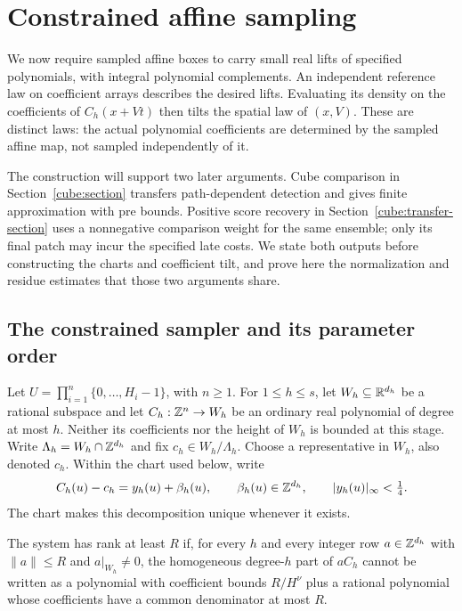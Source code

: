 \section{Constrained affine sampling}
\label{sampling:constrained-section}

We now require sampled affine boxes to carry small real lifts of
specified polynomials, with integral polynomial complements.
An independent reference law on coefficient arrays describes the
desired lifts. Evaluating its density on the coefficients of
$C_h(x+Vt)$ then tilts the spatial law of $(x,V)$. These are distinct
laws: the actual polynomial coefficients are determined by the
sampled affine map, not sampled independently of it.

The construction will support two later arguments. Cube comparison
in Section~\ref{cube:section} transfers path-dependent detection and
gives finite approximation with pre bounds. Positive score recovery
in Section~\ref{cube:transfer-section} uses a nonnegative comparison
weight for the same ensemble; only its final patch may incur the
specified late costs. We state both outputs before constructing the
charts and coefficient tilt, and prove here the normalization and
residue estimates that those two arguments share.

\subsection{The constrained sampler and its parameter order}

Let $U=\prod_{i=1}^n\{0,\ldots,H_i-1\}$, with $n\ge1$.  For $1\le h\le s$, let
$W_h\subseteq\mathbb R^{d_h}$ be a rational subspace and let
$C_h:\mathbb Z^n\to W_h$ be an ordinary real polynomial of degree at most $h$.
Neither its coefficients nor the height of $W_h$ is bounded at this stage.
Write $\Lambda_h=W_h\cap\mathbb Z^{d_h}$ and fix $c_h\in W_h/\Lambda_h$.
Choose a representative in $W_h$, also denoted $c_h$.
Within the chart used below, write
\begin{equation}\label{sampling:lift}
 C_h(u)-c_h=y_h(u)+\beta_h(u),\qquad
 \beta_h(u)\in\mathbb Z^{d_h},\qquad |y_h(u)|_\infty<\tfrac14.
\end{equation}
The chart makes this decomposition unique whenever it exists.

\begin{definition}\label{sampling:rank}
The system has rank at least $R$ if, for every $h$ and every integer row
$a\in\mathbb Z^{d_h}$ with $\|a\|\le R$ and $a|_{W_h}\ne0$, the homogeneous
degree-$h$ part of $aC_h$ cannot be written as a polynomial with coefficient
bounds $R/H^\nu$ plus a rational polynomial whose coefficients have a common
denominator at most $R$.
\end{definition}

